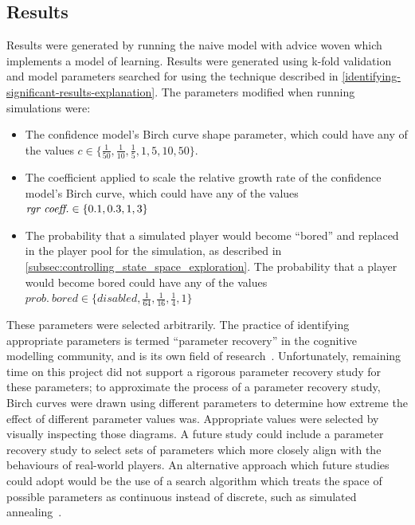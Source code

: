 \subsection{Results}

Results were generated by running the naive model with advice woven which implements a
model of learning. Results were generated using k-fold validation and model
parameters searched for using the technique described in
\cref{identifying-significant-results-explanation}. The parameters modified when
running simulations were:

\begin{itemize}
  \item The confidence model's Birch curve shape parameter, which could have any
  of the values $c \in \{\frac{1}{50}, \frac{1}{10},
    \frac{1}{5}, 1, 5, 10, 50\}$.
    \item The coefficient applied to scale the relative growth rate of the
      confidence model's Birch curve, which could have any of the values
      $\textrm{\emph{rgr~coeff.}} \in \{0.1, 0.3, 1, 3\}$
    \item The probability that a simulated player would become ``bored'' and
    replaced in the player pool for the simulation, as described in
    \cref{subsec:controlling_state_space_exploration}. The probability that a
    player would become bored could have any of the values $prob.~bored \in
    \{disabled, \frac{1}{64}, \frac{1}{16}, \frac{1}{4}, 1\}$
\end{itemize}

These parameters were selected arbitrarily. The practice of identifying
appropriate parameters is termed ``parameter recovery'' in the cognitive
modelling community, and is its own field of
research~\cite{heathcote2015introduction}. Unfortunately, remaining time on this
project did not support a rigorous parameter recovery study for these
parameters; to approximate the process of a parameter recovery study, Birch
curves were drawn using different parameters to determine how extreme the effect
of different parameter values was. Appropriate values were selected by visually
inspecting those diagrams. A future study could include a parameter recovery
study to select sets of parameters which more closely align with the behaviours
of real-world players. An alternative approach which future studies could adopt
would be the use of a search algorithm which treats the space of possible
parameters as continuous instead of discrete, such as simulated
annealing~\cite{kirkpatrick1983optimization}.

